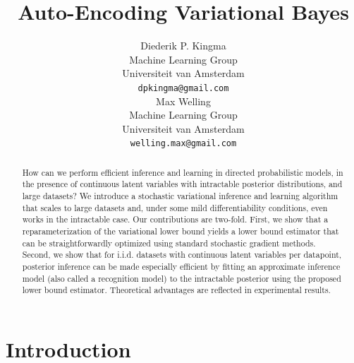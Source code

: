 \documentclass{article} %
\title{Auto-Encoding Variational Bayes}
\author{
Diederik P. Kingma \\
Machine Learning Group \\
Universiteit van Amsterdam \\
\texttt{dpkingma@gmail.com} \\
\And
Max Welling \\
Machine Learning Group \\
Universiteit van Amsterdam \\
\texttt{welling.max@gmail.com} \\
}
\theoremstyle{definition}
\theoremstyle{definition}
\begin{document}
\maketitle

\begin{abstract}
How can we perform efficient inference and learning in directed probabilistic models, in the presence of continuous latent variables with intractable posterior distributions, and large datasets?
We introduce a stochastic variational inference and learning algorithm that scales to large datasets and, under some mild differentiability conditions, even works in the intractable case. Our contributions are two-fold.
First, we show that a reparameterization of the variational lower bound yields a lower bound estimator that can be straightforwardly optimized using standard stochastic gradient methods.
Second, we show that for i.i.d. datasets with continuous latent variables per datapoint, posterior inference can be made especially efficient by fitting an approximate inference model (also called a recognition model) to the intractable posterior using the proposed lower bound estimator. 
Theoretical advantages are reflected in experimental results.
\end{abstract}

\section{Introduction}
\end{document}

